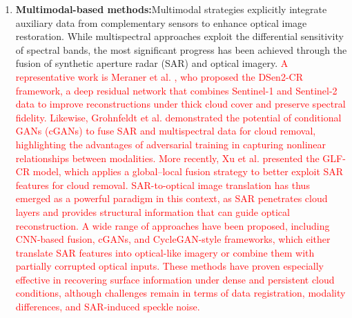 \begin{enumerate}[label=(\Alph*)]
  \item \textbf{Multimodal-based methods:}Multimodal strategies explicitly integrate auxiliary data from complementary sensors to enhance optical image restoration. While multispectral approaches exploit the differential sensitivity of spectral bands, the most significant progress has been achieved through the fusion of synthetic aperture radar (SAR) and optical imagery. \textcolor{red}{A representative work is Meraner et al. \cite{CR_SEN2_dRNN}, who proposed the DSen2-CR framework, a deep residual network that combines Sentinel-1 and Sentinel-2 data to improve reconstructions under thick cloud cover and preserve spectral fidelity. Likewise, Grohnfeldt et al. \cite{A_cGAN_fuse_sar_MS_CR} demonstrated the potential of conditional GANs (cGANs) to fuse SAR and multispectral data for cloud removal, highlighting the advantages of adversarial training in capturing nonlinear relationships between modalities. More recently, Xu et al. \cite{GLF_CR} presented the GLF-CR model, which applies a global–local fusion strategy to better exploit SAR features for cloud removal. SAR-to-optical image translation has thus emerged as a powerful paradigm in this context, as SAR penetrates cloud layers and provides structural information that can guide optical reconstruction. A wide range of approaches have been proposed, including CNN-based fusion, cGANs, and CycleGAN-style frameworks, which either translate SAR features into optical-like imagery or combine them with partially corrupted optical inputs. These methods have proven especially effective in recovering surface information under dense and persistent cloud conditions, although challenges remain in terms of data registration, modality differences, and SAR-induced speckle noise.}


\end{enumerate}
